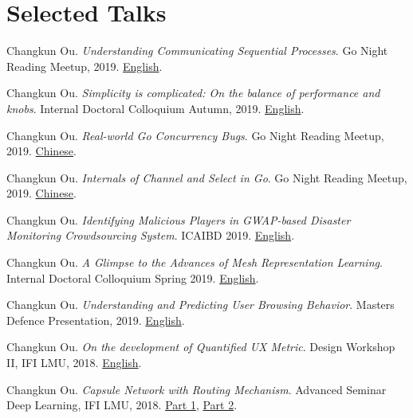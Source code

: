 \section{\textbf{Selected Talks}}
\resumeSubHeadingListStart
    \item{
      Changkun Ou.
      \emph{Understanding Communicating Sequential Processes}.
      Go Night Reading Meetup, 2019. \href{https://github.com/changkun/talks/blob/master/201911/csp.pdf}{English}.
    }
    \item{
      Changkun Ou.
      \emph{Simplicity is complicated: On the balance of performance and knobs}.
      Internal Doctoral Colloquium Autumn, 2019. \href{https://github.com/changkun/talks/blob/master/201910/knobs.pdf}{English}.
    }
    \item{
      Changkun Ou.
      \emph{Real-world Go Concurrency Bugs}.
      Go Night Reading Meetup, 2019. \href{https://github.com/changkun/talks/blob/master/201908/channel.pdf}{Chinese}.
    }
    \item{
      Changkun Ou.
      \emph{Internals of Channel and Select in Go}.
      Go Night Reading Meetup, 2019. \href{https://github.com/changkun/talks/blob/master/201908/channel.pdf}{Chinese}.
    }
    \item{
      Changkun Ou.
      \emph{Identifying Malicious Players in GWAP-based Disaster Monitoring Crowdsourcing System}.
      ICAIBD 2019. \href{https://github.com/changkun/talks/blob/master/201905/gwap.pdf}{English}.
    }
    \item{
      Changkun Ou.
      \emph{A Glimpse to the Advances of Mesh Representation Learning}.
      Internal Doctoral Colloquium Spring 2019. \href{https://github.com/changkun/talks/blob/master/201904/mesh.pdf}{English}.
    }
    \item{
      Changkun Ou.
      \emph{Understanding and Predicting User Browsing Behavior}.
      Masters Defence Presentation, 2019. \href{https://github.com/changkun/talks/blob/master/201901/master.pdf}{English}.
    }
    \item{
      Changkun Ou.
      \emph{On the development of Quantified UX Metric}.
      Design Workshop II, IFI LMU, 2018. \href{https://github.com/changkun/talks/blob/master/201805/qux.pdf}{English}.
    }
    \item{
      Changkun Ou.
      \emph{Capsule Network with Routing Mechanism}.
      Advanced Seminar Deep Learning, IFI LMU, 2018. \href{https://github.com/changkun/talks/blob/master/201712/capsnet1.pdf}{Part 1}, \href{https://github.com/changkun/talks/blob/master/201803/capsnet2.pdf}{Part 2}.
    }
